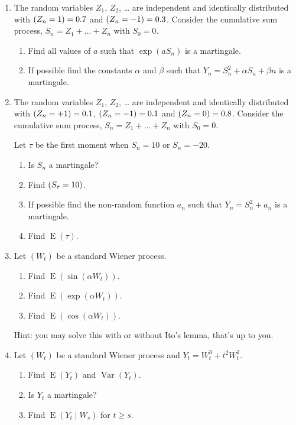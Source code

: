 \documentclass[12pt]{article}
\DeclareMathOperator{\Var}{Var}
\DeclareMathOperator{\E}{E}
\let\P\relax
\DeclareMathOperator{\P}{\mathbb{P}}
\begin{document}
\begin{enumerate}

\item The random variables $Z_1$, $Z_2$, \ldots{} are independent and identically distributed 
with $\P(Z_n = 1) = 0.7$ and $\P(Z_n = -1) = 0.3$. 
Consider the cumulative sum process, $S_n = Z_1 + \ldots + Z_n$ with $S_0=0$.

\begin{enumerate}
  \item Find all values of $a$ such that $\exp(aS_n)$ is a martingale.
  \item If possible find the constants $\alpha$ and $\beta$ such that $Y_n = S_n^2 + \alpha S_n + \beta n$ is a martingale.
\end{enumerate}

\item The random variables $Z_1$, $Z_2$, \ldots{} are independent and identically distributed 
with $\P(Z_n = +1) = 0.1$,  $\P(Z_n = -1) = 0.1$ and $\P(Z_n = 0) = 0.8$. 
Consider the cumulative sum process, $S_n = Z_1 + \ldots + Z_n$ with $S_0=0$.

Let $\tau$ be the first moment when $S_n = 10$ or $S_n = -20$.

\begin{enumerate}
  \item Is $S_n$ a martingale?
  \item Find $\P(S_{\tau} = 10)$.
  \item If possible find the non-random function $a_n$ such that $Y_n = S_n^2 + a_n$ is a martingale. 
  \item Find $\E(\tau)$.
\end{enumerate}

\item Let $(W_t)$ be a standard Wiener process.
\begin{enumerate}
  \item Find $\E(\sin(\alpha W_t))$.
  \item Find $\E(\exp(\alpha W_t))$.
  \item Find $\E(\cos(\alpha W_t))$.
\end{enumerate}
Hint: you may solve this with or without Ito's lemma, that's up to you. 

\item Let $(W_t)$ be a standard Wiener process and $Y_t = W_t^3 + t^2 W_t^2$.
\begin{enumerate}
  \item Find $\E(Y_t)$ and $\Var(Y_t)$.
  \item Is $Y_t$ a martingale?
  \item Find $\E(Y_{t} \mid W_s)$ for $t \geq s$. 
\end{enumerate}


\end{enumerate}
\end{document}
